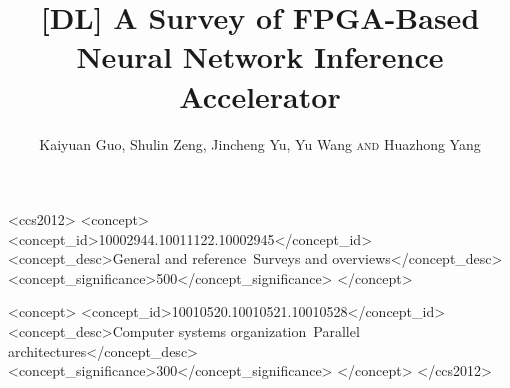 \documentclass[acmsmall]{acmart}
\begin{document}
\title{[DL] A Survey of FPGA-Based Neural Network Inference Accelerator} 

\author{Kaiyuan Guo, Shulin Zeng, Jincheng Yu, Yu Wang {\scshape and} Huazhong Yang}


%
%



\begin{CCSXML}  
  <ccs2012>  
  <concept>  
  <concept_id>10002944.10011122.10002945</concept_id>
   <concept_desc>General and reference~Surveys and overviews</concept_desc>  
  <concept_significance>500</concept_significance>
  </concept>
  
  <concept>  
  <concept_id>10010520.10010521.10010528</concept_id>
   <concept_desc>Computer systems organization~Parallel architectures</concept_desc> 
  <concept_significance>300</concept_significance>
  </concept>
  </ccs2012>  
\end{CCSXML}  
  
%
%



\end{document}
